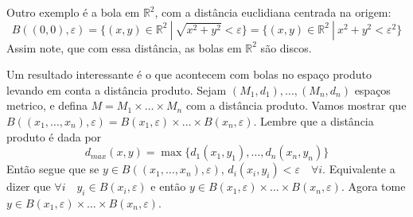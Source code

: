 \documentclass{article}
\begin{document}
Outro exemplo é a bola em $\mathbb{R}^2$, com a distância euclidiana centrada na origem:
\[B((0, 0), \varepsilon) = \{ (x,y) \in \mathbb{R}^2 \: | \: \sqrt{x^2 + y^2} < \varepsilon\} = \{ (x,y) \in \mathbb{R}^2 \: | \: x^2 + y^2 < \varepsilon^2\}\]
Assim note, que com essa distância, as bolas em $\mathbb{R}^2$ são discos.

Um resultado interessante é o que acontecem com bolas no espaço produto levando em conta a distância produto.
Sejam $(M_1, d_1), \dots ,(M_n, d_n)$ espaços metrico, e defina $M = M_1 \times \dots \times M_n $ com a distância produto.
Vamos mostrar que $B((x_1, \dots, x_n), \varepsilon) = B(x_1, \varepsilon) \times \dots \times B(x_n, \varepsilon)$.
Lembre que a distância produto é dada por 
\[d_{max}(x, y) = \max\{d_1(x_1, y_1), \dots, d_n(x_n, y_n)\}\]
Então segue que se $y \in B((x_1, \dots, x_n), \varepsilon)$, $d_i(x_i, y_i) < \varepsilon \quad \forall i$.
Equivalente a dizer que $\forall i \quad y_i \in B(x_i, \varepsilon)$ e então $y \in  B(x_1, \varepsilon) \times \dots \times  B(x_n, \varepsilon)$.
Agora tome $y \in  B(x_1, \varepsilon) \times \dots \times  B(x_n, \varepsilon)$. 
\end{document}
